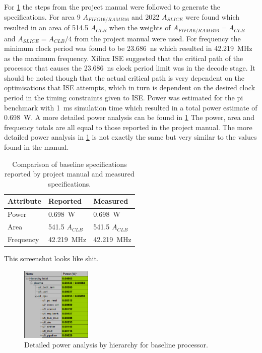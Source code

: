 \documentclass[final]{article}
\begin{document}
For \cref{tab:baselineperformance} the steps from the project manual were followed to generate the specifications.
For area 9 $A_{FIFO16/RAMB16}$ and 2022 $A_{SLICE}$ were found which resulted in an area of 514.5 $A_{CLB}$ when the weights of $A_{FIFO16/RAMB16} = A_{CLB}$ and $A_{SLICE} = A_{CLB}/4$ from the project manual were used.
For frequency the minimum clock period was found to be \SI{23.686}{\nano\second} which resulted in \SI{42.219}{\mega\hertz} as the maximum frequency.
Xilinx ISE suggested that the critical path of the processor that causes the \SI{23.686}{\nano\second} clock period limit was in the decode stage. 
It should be noted though that the actual critical path is very dependent on the optimisations that ISE attempts, which in turn is dependent on the desired clock period in the timing constraints given to ISE.
Power was estimated for the pi benchmark with \SI{1}{\milli\second} simulation time which resulted in a total power estimate of \SI{0.698}{\watt}.
A more detailed power analysis can be found in \cref{fig:baselinepower}
The power, area and frequency totals are all equal to those reported in the project manual.
The more detailed power analysis in \cref{fig:baselinepower} is not exactly the same but very similar to the values found in the manual.


\begin{table}[H]
    \centering
    \caption{Comparison of baseline specifications reported by project manual and measured specifications.}
    \label{tab:baselineperformance}
    \begin{tabular}{lll}
        \toprule
        \textbf{Attribute} & \textbf{Reported} & \textbf{Measured}      \\
        \midrule
        Power    &  \SI{0.698}{\watt}        & \SI{0.698}{\watt}        \\
        Area     &  \num{541.5} $A_{CLB}$    & \num{541.5} $A_{CLB}$    \\
        Frequency&  \SI{42.219}{\mega\hertz} & \SI{42.219}{\mega\hertz} \\
        \bottomrule
    \end{tabular}

\end{table}

This screenshot looks like shit.
\begin{figure}[H]
\centering
\includegraphics[width=0.3\textwidth]{resources/baselinepower.png}
\caption{Detailed power analysis by hierarchy for baseline processor.}
\label{fig:baselinepower}
\end{figure}
\end{document}

